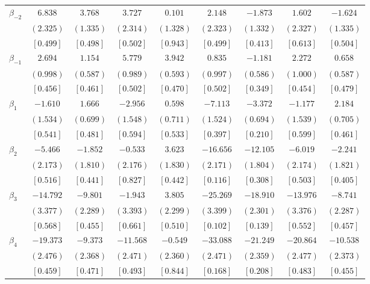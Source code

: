 \documentclass[12pt]{article}
\begin{document}
\begin{table}[h!]
\begin{adjustbox}{width=\textwidth}
\begin{tabular}{lcccccccc}
$\beta_{-2}$ & $  6.838$ & $  3.768$ & $  3.727$ & $  0.101$ & $  2.148$ & $ -1.873$ & $  1.602$ & $ -1.624$ \\
& $(  2.325)$ & $(  1.335)$ & $(  2.314)$ & $(  1.328)$ & $(  2.323)$ & $(  1.332)$ & $(  2.327)$ & $(  1.335)$ \\
& $[  0.499]$ & $[  0.498]$ & $[  0.502]$ & $[  0.943]$ & $[  0.499]$ & $[  0.413]$ & $[  0.613]$ & $[  0.504]$ \\

$\beta_{-1}$ & $  2.694$ & $  1.154$ & $  5.779$ & $  3.942$ & $  0.835$ & $ -1.181$ & $  2.272$ & $  0.658$ \\
& $(  0.998)$ & $(  0.587)$ & $(  0.989)$ & $(  0.593)$ & $(  0.997)$ & $(  0.586)$ & $(  1.000)$ & $(  0.587)$ \\
& $[  0.456]$ & $[  0.461]$ & $[  0.502]$ & $[  0.470]$ & $[  0.502]$ & $[  0.349]$ & $[  0.454]$ & $[  0.479]$ \\

$\beta_{1}$ & $ -1.610$ & $  1.666$ & $ -2.956$ & $  0.598$ & $ -7.113$ & $ -3.372$ & $ -1.177$ & $  2.184$ \\
& $(  1.534)$ & $(  0.699)$ & $(  1.548)$ & $(  0.711)$ & $(  1.524)$ & $(  0.694)$ & $(  1.539)$ & $(  0.705)$ \\
& $[  0.541]$ & $[  0.481]$ & $[  0.594]$ & $[  0.533]$ & $[  0.397]$ & $[  0.210]$ & $[  0.599]$ & $[  0.461]$ \\

$\beta_{2}$ & $ -5.466$ & $ -1.852$ & $ -0.533$ & $  3.623$ & $-16.656$ & $-12.105$ & $ -6.019$ & $ -2.241$ \\
& $(  2.173)$ & $(  1.810)$ & $(  2.176)$ & $(  1.830)$ & $(  2.171)$ & $(  1.804)$ & $(  2.174)$ & $(  1.821)$ \\
& $[  0.516]$ & $[  0.441]$ & $[  0.827]$ & $[  0.442]$ & $[  0.116]$ & $[  0.308]$ & $[  0.503]$ & $[  0.405]$ \\

$\beta_{3}$ & $-14.792$ & $ -9.801$ & $ -1.943$ & $  3.805$ & $-25.269$ & $-18.910$ & $-13.976$ & $ -8.741$ \\
& $(  3.377)$ & $(  2.289)$ & $(  3.393)$ & $(  2.299)$ & $(  3.399)$ & $(  2.301)$ & $(  3.376)$ & $(  2.287)$ \\
& $[  0.568]$ & $[  0.455]$ & $[  0.661]$ & $[  0.510]$ & $[  0.102]$ & $[  0.139]$ & $[  0.552]$ & $[  0.457]$ \\

$\beta_{4}$ & $-19.373$ & $ -9.373$ & $-11.568$ & $ -0.549$ & $-33.088$ & $-21.249$ & $-20.864$ & $-10.538$ \\
& $(  2.476)$ & $(  2.368)$ & $(  2.471)$ & $(  2.360)$ & $(  2.471)$ & $(  2.359)$ & $(  2.477)$ & $(  2.373)$ \\
& $[  0.459]$ & $[  0.471]$ & $[  0.493]$ & $[  0.844]$ & $[  0.168]$ & $[  0.208]$ & $[  0.483]$ & $[  0.455]$ \\


\end{tabular}
\end{adjustbox}
\end{table}
\end{document}
